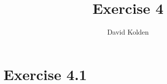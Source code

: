 \documentclass{article}
\title{Exercise 4}
\author{David Kolden}
\begin{document}
\maketitle
\section{Exercise 4.1}

\subsection{}
\end{document}
